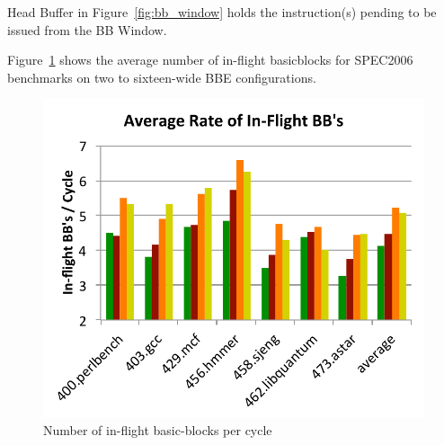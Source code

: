 Head Buffer in Figure~\ref{fig:bb_window} holds the instruction(s) pending to be
issued from the BB Window.

Figure~\ref{fig:inflight_bb} shows the average number of in-flight basicblocks for SPEC2006
benchmarks on two to sixteen-wide BBE configurations.

\begin{figure}
	\centering
	\includegraphics[width=1.0\columnwidth]{result/inflight_bb.pdf} 
	\caption{Number of in-flight basic-blocks per cycle}
	\label{fig:inflight_bb}
\end{figure}





